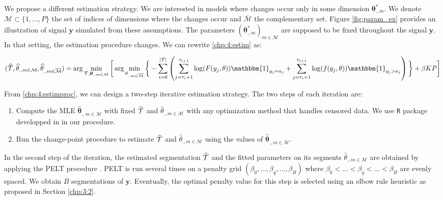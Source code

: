 We propose a different estimation strategy. We are interested in models where changes occur only in some dimension $\bm\theta^*_{.,m}$. We denote $\mathcal{M} \subset \{1,\dots,P\}$ the set of indices of dimensions where the changes occur and $\overline{\mathcal{M}}$ the complementary set. Figure \ref{fig:param_ex} provides an illustration of signal $\bm y$ simulated from these assumptions. The parameters $(\bm\theta^*_{.,m})_{m \in \overline{\mathcal{M}}}$ are supposed to be fixed throughout the signal $\bm y$. In that setting, the estimation procedure changes. We can rewrite \ref{chp:4:estim} as: 
    
\begin{dmath}\label{chp:4:estimproc}
(\widehat{\TT},\widehat{\theta}_{.,m\in\mathcal{M}},\widehat{\theta}_{.,m\in\overline{\mathcal{M}}}) = \arg\min_{\TT,\bm \theta_{.,m\in\mathcal{M}}}\bigg[\arg\min_{\theta_{.,m\in\overline{\mathcal{M}}}}\bigg\{ - \sum_{i=0}^{\lvert \TT \rvert}  \left(\sum_{j=\tau_i+1}^{\tau_{i+1}}\log(F(y_j,\theta))\mathbbm{1}_{y_j=a_j}+\sum_{j=\tau_i+1}^{\tau_{i+1}}\log(f(y_j,\theta))\mathbbm{1}_{y_j>a_j}\right)\bigg\}+\beta KP \bigg]
\end{dmath}

From \ref{chp:4:estimproc}, we can design a two-step iterative estimation strategy. The two steps of each iteration are:
\begin{enumerate}
\item Compute the MLE $\widehat{\bm\theta}_{{.,m\in\overline{\mathcal{M}}}}$ with fixed $\widehat{{\mathcal T}}$ and $\widehat{\theta}_{.,m\in\mathcal{M}}$ with any optimization method that handles censored data. We use \texttt{R} package developped in \cite{delignette2015} in our procedure.  
\item Run the change-point procedure to estimate $\widehat{{\mathcal T}}$ and $\widehat{\theta}_{.,m\in\mathcal{M}}$ using the values of $\widehat{\bm\theta}_{{.,m\in\overline{\mathcal{M}}}}$.
\end{enumerate} 

In the second step of the iteration, the estimated segmentation $\widehat{{\mathcal T}}$ and the fitted parameters on its segments $\widehat{\theta}_{.,m\in\mathcal{M}}$ are obtained by applying the PELT procedure \citep{Killick2012}. PELT is run several times on a penalty grid $(\beta_0,\dots,\beta_q,\dots,\beta_{B})$ where $\beta_0<\dots<\beta_{q}<\dots<\beta_{B}$ are evenly spaced. We obtain $B$ segmentations of $\bm{y}$. Eventually, the optimal penalty value for this step is selected using an elbow rule heuristic as proposed in Section \ref{chp:3:2}.

